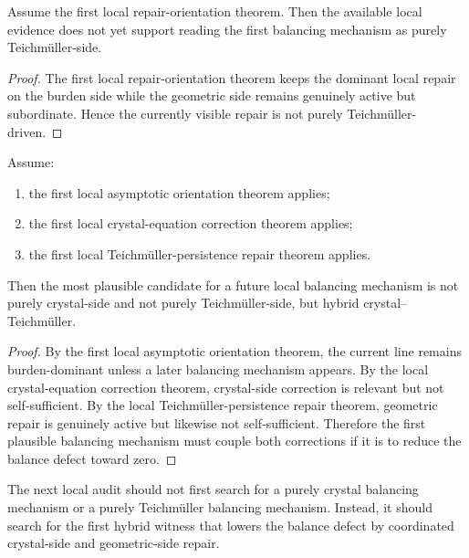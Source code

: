 \begin{proposition}
\label{prop:current-line-does-not-yet-support-purely-teichmueller-balancing}
Assume the first local repair-orientation theorem. Then the available local evidence does not yet support reading the first balancing mechanism as purely Teichm\"uller-side.
\end{proposition}

\begin{proof}
The first local repair-orientation theorem keeps the dominant local repair on the burden side while the geometric side remains genuinely active but subordinate. Hence the currently visible repair is not purely Teichm\"uller-driven.
\end{proof}

\begin{theorem}
\label{thm:first-local-balancing-mechanism-orientation-theorem}
Assume:
\begin{enumerate}[leftmargin=2em,label=(\alph*)]
  \item the first local asymptotic orientation theorem applies;
  \item the first local crystal-equation correction theorem applies;
  \item the first local Teichm\"uller-persistence repair theorem applies.
\end{enumerate}
Then the most plausible candidate for a future local balancing mechanism is not purely crystal-side and not purely Teichm\"uller-side, but hybrid crystal--Teichm\"uller.
\end{theorem}

\begin{proof}
By the first local asymptotic orientation theorem, the current line remains burden-dominant unless a later balancing mechanism appears. By the local crystal-equation correction theorem, crystal-side correction is relevant but not self-sufficient. By the local Teichm\"uller-persistence repair theorem, geometric repair is genuinely active but likewise not self-sufficient. Therefore the first plausible balancing mechanism must couple both corrections if it is to reduce the balance defect toward zero.
\end{proof}

\begin{corollary}
\label{cor:current-balancing-mechanism-working-rule}
The next local audit should not first search for a purely crystal balancing mechanism or a purely Teichm\"uller balancing mechanism. Instead, it should search for the first hybrid witness that lowers the balance defect by coordinated crystal-side and geometric-side repair.
\end{corollary}

